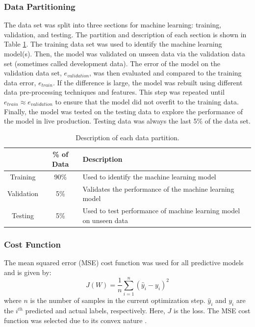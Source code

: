 \subsubsection{Data Partitioning}
The data set was split into three sections for machine learning: training, validation, and testing.  The partition and description of each section is shown in Table \ref{tab:08datapart}. The training data set was used to identify the machine learning model(s).  Then, the model was validated on unseen data via the validation data set (sometimes called development data).  The error of the model on the validation data set, $e_{validation}$, was then evaluated and compared to the training data error, $e_{train}$.  If the difference is large, the model was rebuilt using different data pre-processing techniques and features. This step was repeated until $e_{train} \approx e_{validation}$ to ensure that the model did not overfit to the training data. Finally, the model was tested on the testing data to explore the performance of the model in live production.  Testing data was always the last 5\% of the data set.
\begin{table}[h]
    \centering
    {
    \begin{tabular}{ c | c | p{9cm}}
                            & \% of Data        &  Description \\
        \hline
        Training            &  90\%             
        &  Used to identify the machine learning model        \\
        
        Validation          &  5\%              
        &  Validates the performance of the machine learning model         \\
        
        Testing             &  5\%             
        &  Used to test performance of machine learning model on unseen data       \\             
    \end{tabular}}
    \caption{Description of each data partition.}
    \label{tab:08datapart}
\end{table}

\subsubsection{Cost Function}

The mean squared error (MSE) cost function was used for all predictive models and is given by:
\begin{equation}
    J(W) = \frac{1}{n}\sum\limits^n_{i=1}(\hat{y}_i - y_i)^2
    \label{eq:08MSE}
\end{equation}
where $n$ is the number of samples in the current optimization step.  $\hat{y}_i$ and $y_i$ are the $i^{th}$ predicted and actual labels, respectively. Here, $J$ is the loss. The MSE cost function was selected due to its convex nature \cite{deeplearning_course}.

